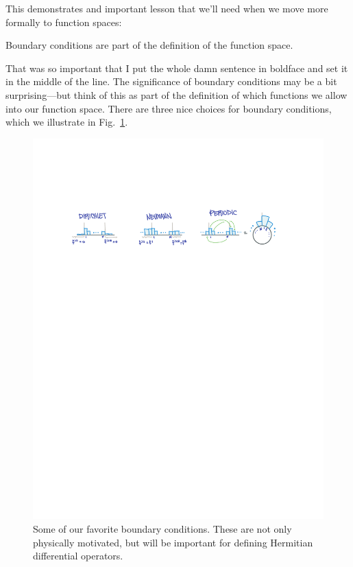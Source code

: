 \documentclass[12pt, oneside]{report}    %
\begin{document}
This demonstrates and important lesson that we’ll need when we move more formally to function spaces:
\begin{bigidea}
{Boundary conditions are part of the definition of the function space}.   
\end{bigidea}
That was so important that I put the whole damn sentence in boldface and set it in the middle of the line. The significance of boundary conditions may be a bit surprising---but think of this as part of the definition of which functions we allow into our function space. 
% 
There are three nice choices for boundary conditions, which we illustrate in Fig.~\ref{fig:boundary:conditions}.

%

\begin{figure}[tb]
    \centering
    \includegraphics[width=.95\textwidth]{figures/BoundaryConditions.pdf}
    \caption{Some of our favorite boundary conditions. These are not only physically motivated, but will be important for defining Hermitian differential operators.}
    \label{fig:boundary:conditions}
\end{figure}
\end{document}
